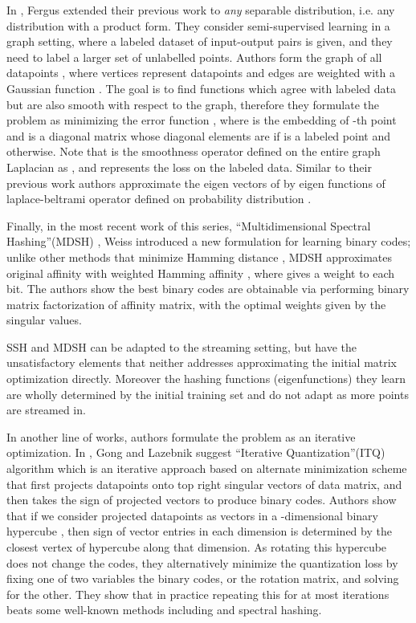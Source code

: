 \documentclass{sig-alternate}
\begin{document}
In \cite{fergus2009semi}, Fergus \etal extended their previous work\cite{weiss2009spectral} to \textit{any} separable distribution, i.e. any distribution  with a product form.
They consider semi-supervised learning in a graph setting, where a labeled dataset of input-output pairs 
 is given, and they need to label a larger set  of unlabelled points.
Authors form the graph of all datapoints , where vertices represent datapoints and edges are weighted with a Gaussian function . 
The goal is to find functions  which agree with labeled data but are also smooth with respect to the graph, therefore they formulate the problem as minimizing the error function , where  is the embedding of -th point and  is a diagonal matrix whose diagonal elements are
 if  is a labeled point and  otherwise.
Note that  is the smoothness operator defined on the entire graph Laplacian as , and  represents the loss on the labeled data.
Similar to their previous work\cite{weiss2009spectral} authors approximate the eigen vectors of  by eigen functions
of laplace-beltrami operator defined on probability distribution .

Finally, in the most recent work of this series, ``Multidimensional Spectral Hashing''(MDSH) \cite{weiss2012multidimensional}, Weiss \etal introduced a new formulation for learning binary codes; unlike other methods that minimize Hamming distance , MDSH  approximates original affinity  with weighted Hamming affinity , where  gives a weight to each bit.
The authors show the best binary codes are obtainable via performing binary matrix factorization of affinity matrix, with the optimal weights given by the singular values. 

SSH and MDSH can be adapted to the streaming setting, but have the unsatisfactory elements that neither addresses approximating the initial matrix optimization directly. Moreover the hashing functions (eigenfunctions) they learn are wholly determined by the initial training set and do not adapt as more points are streamed in.

In another line of works, authors formulate the problem as an iterative optimization. 
In \cite{gong2011iterative}, Gong and Lazebnik suggest ``Iterative Quantization''(ITQ) algorithm which is an iterative approach based on alternate minimization scheme that first projects datapoints onto top  right singular vectors of data matrix, and then takes the sign of projected vectors to produce binary codes. Authors show that if we consider projected datapoints as vectors in a -dimensional binary hypercube , then sign of vector entries in each dimension is determined by the closest vertex of hypercube along that dimension. As rotating this hypercube does not change the codes, they alternatively minimize the quantization loss  by fixing one of two variables  the binary codes, or  the rotation matrix, and solving for the other. They show that in practice repeating this for at most  iterations beats some well-known methods including \cite{fergus2009semi,raginsky2009locality} and spectral hashing\cite{weiss2009spectral}.
\end{document}
